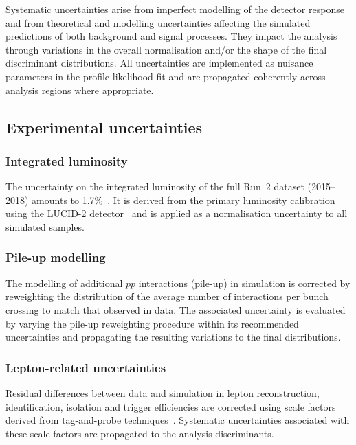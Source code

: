 ﻿Systematic uncertainties arise from imperfect modelling of the detector response and from theoretical and modelling uncertainties affecting the simulated predictions of both background and signal processes.
They impact the analysis through variations in the overall normalisation and/or the shape of the final discriminant distributions.
All uncertainties are implemented as nuisance parameters in the profile-likelihood fit and are propagated coherently across analysis regions where appropriate.

\subsection{Experimental uncertainties}
\label{sec:syst_exp}

\subsubsection{Integrated luminosity}

The uncertainty on the integrated luminosity of the full Run~2 dataset (2015--2018) amounts to 1.7\%~\cite{ATLAS-CONF-2019-021}.
It is derived from the primary luminosity calibration using the LUCID-2 detector~\cite{Avoni_2018} and is applied as a normalisation uncertainty to all simulated samples.

\subsubsection{Pile-up modelling}

The modelling of additional $pp$ interactions (pile-up) in simulation is corrected by reweighting the distribution of the average number of interactions per bunch crossing to match that observed in data.
The associated uncertainty is evaluated by varying the pile-up reweighting procedure within its recommended uncertainties and propagating the resulting variations to the final distributions.

\subsubsection{Lepton-related uncertainties}

Residual differences between data and simulation in lepton reconstruction, identification, isolation and trigger efficiencies are corrected using scale factors derived from tag-and-probe techniques~\cite{Aad:2019tso,Aad:2020gmm}.
Systematic uncertainties associated with these scale factors are propagated to the analysis discriminants.

